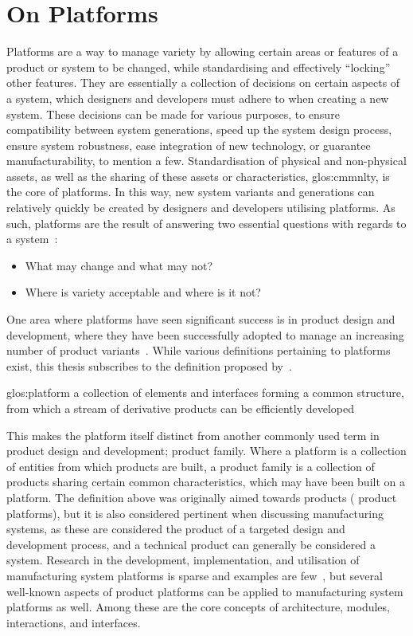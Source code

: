 \section{On Platforms}
Platforms are a way to manage variety by allowing certain areas or features of a product or system to be changed, while standardising and effectively ``locking'' other features. 
They are essentially a collection of decisions on certain aspects of a system, which designers and developers must adhere to when creating a new system.
These decisions can be made for various purposes, \eg{} to ensure compatibility between system generations, speed up the system design process, ensure system robustness, ease integration of new technology, or guarantee manufacturability, to mention a few.
Standardisation of physical and non-physical assets, as well as the sharing of these assets or characteristics, \ie{} \gls{glos:cmmnlty}, is the core of platforms.
In this way, new system variants and generations can relatively quickly be created by designers and developers utilising platforms.
As such, platforms are the result of answering two essential questions with regards to a system~\parencite{SorensenMCPC2017}:
\begin{itemize}
	\item What may change and what may not?
	\item Where is variety acceptable and where is it not?
\end{itemize}
One area where platforms have seen significant success is in product design and development, where they have been successfully adopted to manage an increasing number of product variants~\parencite{AIE:276705}.
While various definitions pertaining to platforms exist, this thesis subscribes to the definition proposed by~\textcite{MeyerLehnerd}.
\begin{definition}{\gls{glos:platform}}
a collection of elements and interfaces forming a common structure, from which a stream of derivative products can be efficiently developed~\parencite{MeyerLehnerd}
\end{definition}
This makes the platform itself distinct from another commonly used term in product design and development; product family.
Where a platform is a collection of entities from which products are built, a product family is a collection of products sharing certain common characteristics, which may have been built on a platform.
The definition above was originally aimed towards products (\ie{} product platforms), but it is also considered pertinent when discussing manufacturing systems, as these are considered the product of a targeted design and development process, and a technical product can generally be considered a system.
Research in the development, implementation, and utilisation of manufacturing system platforms is sparse and examples are few~\parencite{BossenPbCd,SorensenAPMS2018}, but several well-known aspects of product platforms can be applied to manufacturing system platforms as well.
Among these are the core concepts of architecture, modules, interactions, and interfaces.


